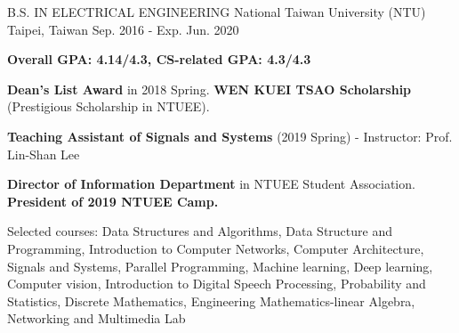 

\begin{cventries}

  \cventry
    {B.S. IN ELECTRICAL ENGINEERING } %
    {National Taiwan University (NTU) } %
    {Taipei, Taiwan} %
    {Sep. 2016 - Exp. Jun. 2020} %
    {
      \begin{cvitems} %
        \item {\textbf{Overall GPA: 4.14/4.3, CS-related GPA: 4.3/4.3} }
        \item {\textbf{Dean’s List Award} in 2018 Spring. \textbf{WEN KUEI TSAO Scholarship} (Prestigious Scholarship in NTUEE).}
        \item {\textbf{Teaching Assistant of Signals and Systems} (2019 Spring) - Instructor: Prof. Lin-Shan Lee}
        \item {\textbf{Director of Information Department} in NTUEE Student Association. \textbf{President of 2019 NTUEE Camp.}}
        \item {Selected courses: Data Structures and Algorithms, Data Structure and Programming, Introduction to Computer Networks, Computer Architecture, Signals and Systems, Parallel Programming, Machine learning, Deep learning, Computer vision, Introduction to Digital Speech Processing, Probability and Statistics, Discrete Mathematics, Engineering Mathematics-linear Algebra, Networking and Multimedia Lab}
      \end{cvitems}
    }

\end{cventries}
